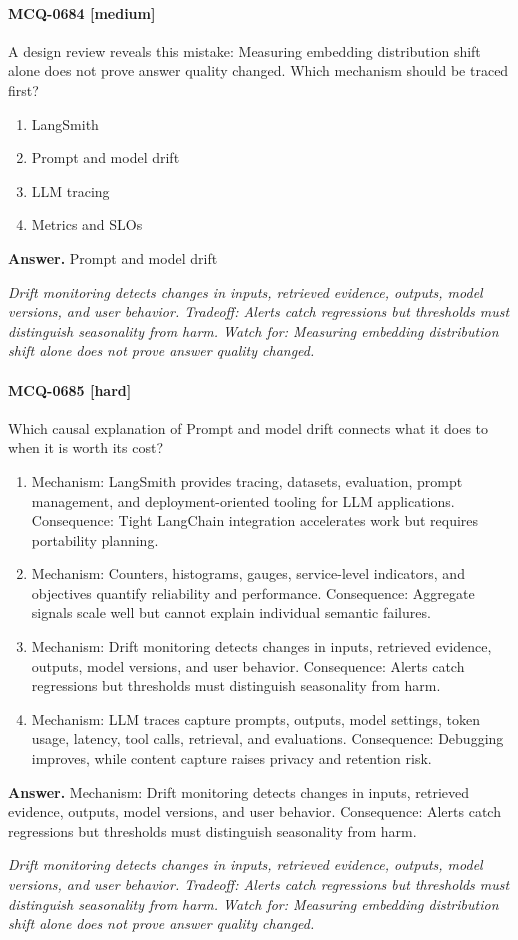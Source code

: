 \paragraph{MCQ-0684 [medium]} A design review reveals this mistake: Measuring embedding distribution shift alone does not prove answer quality changed. Which mechanism should be traced first?
\begin{enumerate}[label=\Alph*.]
\item LangSmith
\item Prompt and model drift
\item LLM tracing
\item Metrics and SLOs
\end{enumerate}
\noindent\textbf{Answer.} Prompt and model drift
\par\textit{Drift monitoring detects changes in inputs, retrieved evidence, outputs, model versions, and user behavior. Tradeoff: Alerts catch regressions but thresholds must distinguish seasonality from harm. Watch for: Measuring embedding distribution shift alone does not prove answer quality changed.}
\paragraph{MCQ-0685 [hard]} Which causal explanation of Prompt and model drift connects what it does to when it is worth its cost?
\begin{enumerate}[label=\Alph*.]
\item Mechanism: LangSmith provides tracing, datasets, evaluation, prompt management, and deployment-oriented tooling for LLM applications. Consequence: Tight LangChain integration accelerates work but requires portability planning.
\item Mechanism: Counters, histograms, gauges, service-level indicators, and objectives quantify reliability and performance. Consequence: Aggregate signals scale well but cannot explain individual semantic failures.
\item Mechanism: Drift monitoring detects changes in inputs, retrieved evidence, outputs, model versions, and user behavior. Consequence: Alerts catch regressions but thresholds must distinguish seasonality from harm.
\item Mechanism: LLM traces capture prompts, outputs, model settings, token usage, latency, tool calls, retrieval, and evaluations. Consequence: Debugging improves, while content capture raises privacy and retention risk.
\end{enumerate}
\noindent\textbf{Answer.} Mechanism: Drift monitoring detects changes in inputs, retrieved evidence, outputs, model versions, and user behavior. Consequence: Alerts catch regressions but thresholds must distinguish seasonality from harm.
\par\textit{Drift monitoring detects changes in inputs, retrieved evidence, outputs, model versions, and user behavior. Tradeoff: Alerts catch regressions but thresholds must distinguish seasonality from harm. Watch for: Measuring embedding distribution shift alone does not prove answer quality changed.}
